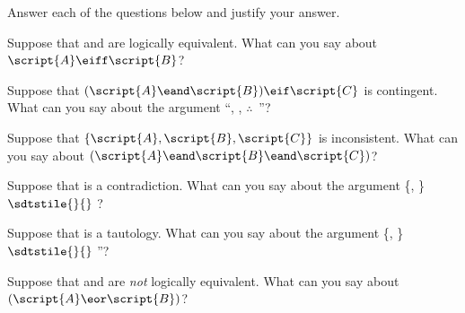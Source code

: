 \noindent\problempart
\label{pr.TT.concepts}
Answer each of the questions below and justify your answer.
\begin{exercises}
\item Suppose that  and  are logically equivalent. What can you say about $\script{A}\eiff\script{B}$?
\item Suppose that $(\script{A}\eand\script{B})\eif\script{C}$ is contingent. What can you say about the argument ``, , $\therefore$\ ''?
\item Suppose that $\{\script{A},\script{B}, \script{C}\}$ is inconsistent. What can you say about $(\script{A}\eand\script{B}\eand\script{C})$?
\item Suppose that  is a contradiction. What can you say about the argument \{, \} $\sdtstile{}{}$  ?
\item Suppose that  is a tautology. What can you say about the argument \{, \} $\sdtstile{}{}$ ''?
\item Suppose that  and  are \emph{not} logically equivalent. What can you say about $(\script{A}\eor\script{B})$?
\end{exercises}

